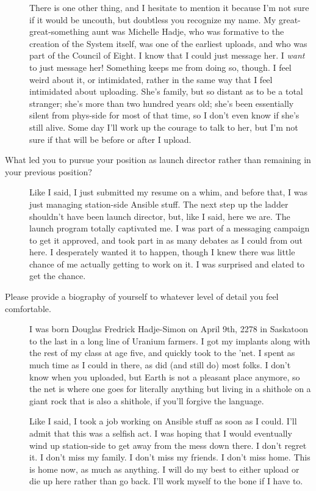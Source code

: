 \begin{description}
There is one other thing, and I hesitate to mention it because I'm not sure if it would be uncouth, but doubtless you recognize my name. My great-great-something aunt was Michelle Hadje, who was formative to the creation of the System itself, was one of the earliest uploads, and who was part of the Council of Eight. I know that I could just message her. I \emph{want} to just message her! Something keeps me from doing so, though. I feel weird about it, or intimidated, rather in the same way that I feel intimidated about uploading. She's family, but so distant as to be a total stranger; she's more than two hundred years old; she's been essentially silent from phys-side for most of that time, so I don't even know if she's still alive. Some day I'll work up the courage to talk to her, but I'm not sure if that will be before or after I upload.
\item[What led you to pursue your position as launch director rather than remaining in your previous position?]
Like I said, I just submitted my resume on a whim, and before that, I was just managing station-side Ansible stuff. The next step up the ladder shouldn't have been launch director, but, like I said, here we are. The launch program totally captivated me. I was part of a messaging campaign to get it approved, and took part in as many debates as I could from out here. I desperately wanted it to happen, though I knew there was little chance of me actually getting to work on it. I was surprised and elated to get the chance.
\item[Please provide a biography of yourself to whatever level of detail you feel comfortable.]
I was born Douglas Fredrick Hadje-Simon on April 9th, 2278 in Saskatoon to the last in a long line of Uranium farmers. I got my implants along with the rest of my class at age five, and quickly took to the 'net. I spent as much time as I could in there, as did (and still do) most folks. I don't know when you uploaded, but Earth is not a pleasant place anymore, so the net is where one goes for literally anything but living in a shithole on a giant rock that is also a shithole, if you'll forgive the language.

Like I said, I took a job working on Ansible stuff as soon as I could. I'll admit that this was a selfish act. I was hoping that I would eventually wind up station-side to get away from the mess down there. I don't regret it. I don't miss my family. I don't miss my friends. I don't miss home. This is home now, as much as anything. I will do my best to either upload or die up here rather than go back. I'll work myself to the bone if I have to.


\end{description}
